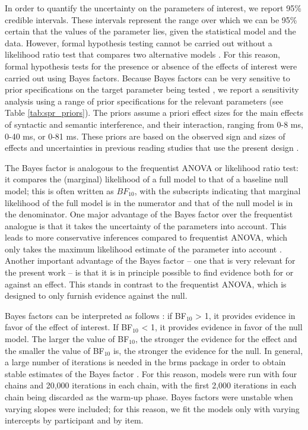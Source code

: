 \documentclass[a4paper, man, floatsintext]{apa7}
\begin{document}
In order to quantify the uncertainty on the parameters of interest, we report 95\% credible intervals.  
These intervals represent the range over which we can be 95\% certain that the values of the parameter lies, given the statistical model and the data. However, formal hypothesis testing cannot be carried out without a likelihood ratio test that compares two alternative models \parencite{schad_etal_2022_BF,Royall}. For this reason, formal hypothesis tests for the presence or absence of the effects of interest were carried out using Bayes factors. Because Bayes factors can be very sensitive to prior specifications on the target parameter being tested \parencite{schad_etal_2022_BF}, 
we report a sensitivity analysis using a range of prior specifications for the relevant parameters (see Table \ref{tab:spr_priors}). The priors assume a priori effect sizes for the main effects of syntactic and semantic interference, and their interaction, ranging from 0-8 ms, 0-40 ms, or 0-81 ms.  These priors are based on the observed sign and sizes of effects and uncertainties in previous reading studies that use the present design \parencite{vandyke07,mertzen}.

The Bayes factor is analogous to the frequentist ANOVA or likelihood ratio test: it compares the (marginal) likelihood of a full model to that of a baseline null model; this is often written as $BF_{10}$, with the subscripts indicating that marginal likelihood of the full model is in the numerator and that of the null model is in the denominator. One major advantage of the Bayes factor over the frequentist analogue is that it takes the uncertainty of the parameters into account. This leads to more conservative inferences compared to frequentist ANOVA, which only takes the maximum likelihood estimate of the parameter into account \parencite[see][for detailed discussion]{schad_etal_2022_BF}. Another important advantage of the Bayes factor -- one that is very relevant for the present work -- is that it is in principle possible to find evidence both for or against an effect. This stands in contrast to the frequentist ANOVA, which is designed to only furnish evidence against the null. 

Bayes factors can be interpreted as follows \parencite[e.g., ][]{lee2014bayesian}: if BF$_{10}$ > 1, it provides evidence in favor of the effect of interest. If BF$_{10}$ < 1, it provides evidence in favor of the null model. The larger the value of BF$_{10}$, the stronger the evidence for the effect and the smaller the value of BF$_{10}$ is, the stronger the evidence for the null. 
In general, a large number of iterations is needed in the brms package in order to obtain stable estimates of the Bayes factor  \citep{schad_etal_2022_BF}.
For this reason, models were run with four chains and 20,000 iterations in each chain, with the first 2,000 iterations in each chain being discarded as the warm-up phase.  Bayes factors were unstable when varying slopes were included; for this reason, we fit the models only with varying intercepts by participant and by item.
\end{document}
